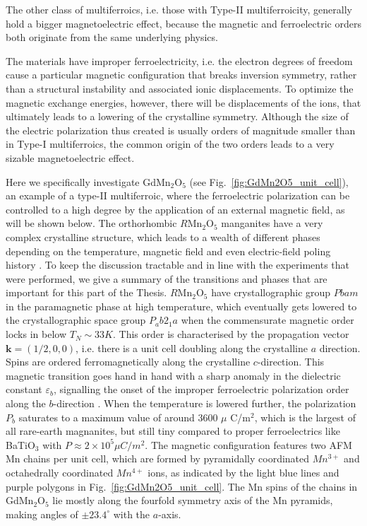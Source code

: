 The other class of multiferroics, i.e. those with Type-II multiferroicity, generally hold a bigger magnetoelectric effect, because the magnetic and ferroelectric orders both originate from the same underlying physics.

The materials have improper ferroelectricity, i.e. the electron degrees of freedom cause a particular magnetic configuration that breaks inversion symmetry, rather than a structural instability and associated ionic displacements.
To optimize the magnetic exchange energies, however, there will be displacements of the ions, that ultimately leads to a lowering of the crystalline symmetry.  
Although the size of the electric polarization thus created is usually orders of magnitude smaller than in Type-I multiferroics, the common origin of the two orders leads to a very sizable magnetoelectric effect.

Here we specifically investigate GdMn$_2$O$_5$ (see Fig.~\ref{fig:GdMn2O5_unit_cell}), an example of a type-II multiferroic\cite{Khomskii2009}, where the ferroelectric polarization can be controlled to a high degree by the application of an external magnetic field, as will be shown below.
The orthorhombic $R$Mn$_2$O$_5$ manganites have a very complex crystalline structure, which leads to a wealth of different phases depending on the temperature, magnetic field and even electric-field poling history \cite{Zheng2019}.
To keep the discussion tractable and in line with the experiments that were performed, we give a summary of the transitions and phases that are important for this part of the Thesis.
$R$Mn$_2$O$_5$ have crystallographic group $Pbam$ \cite{Alfonso97a} in the paramagnetic phase at high temperature, which eventually gets lowered to the crystallographic space group $P_ab2_1a$ when the commensurate magnetic order locks in below $T_{N} \sim 33K$.
This order is characterised by the propagation vector $\bm{k} = (1/2, 0, 0)$, i.e. there is a unit cell doubling along the crystalline $a$ direction. Spins are ordered ferromagnetically along the crystalline $c$-direction. This magnetic transition goes hand in hand with a sharp anomaly in the dielectric constant $\varepsilon_b$, signalling the onset of the improper ferroelectric polarization order along the $b$-direction \cite{Lee13}.
When the temperature is lowered further, the polarization $P_b$ saturates to a maximum value of around 3600 $\mu$ C/m$^2$, which is the largest of all rare-earth magnanites, but still tiny compared to proper ferroelectrics like BaTiO$_3$ with $P \approx 2 \times 10^5 \mu C/m^2$.
The magnetic configuration features two AFM Mn chains per unit cell, which are formed by pyramidally coordinated $Mn^{3+}$ and octahedrally coordinated $Mn^{4+}$ ions, as indicated by the light blue lines and purple polygons in Fig.~\ref{fig:GdMn2O5_unit_cell}. The Mn spins of the chains in GdMn$_2$O$_5$ lie mostly along the fourfold symmetry axis of the Mn pyramids, making angles of $\pm 23.4^\circ$ with the $a$-axis.

